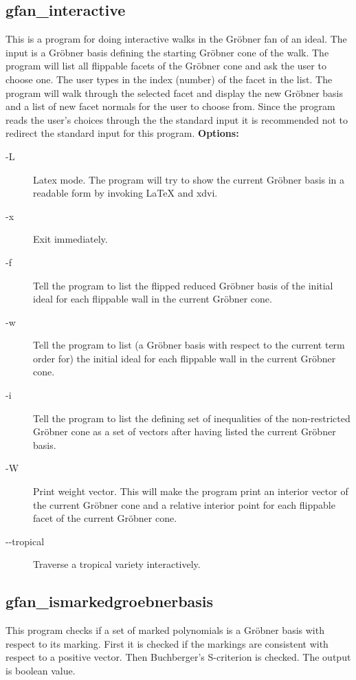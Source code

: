 {{{{{{{{{{{{{{{{\subsection{gfan\_interactive}\label{applist:_interactive}
This is a program for doing interactive walks in the Gr\"obner fan of an ideal. The input is a Gr\"obner basis defining the starting Gr\"obner cone of the walk. The program will list all flippable facets of the Gr\"obner cone and ask the user to choose one. The user types in the index (number) of the facet in the list. The program will walk through the selected facet and display the new Gr\"obner basis and a list of new facet normals for the user to choose from. Since the program reads the user's choices through the the standard input it is recommended not to redirect the standard input for this program.
\newline
{\bf Options:}
\begin{description}
\item[-L]Latex mode. The program will try to show the current Gr\"obner basis in a readable form by invoking LaTeX and xdvi.
\item[-x]Exit immediately.
\item[-f]Tell the program to list the flipped reduced Gr\"obner basis of the initial ideal for each flippable wall in the current Gr\"obner cone.
\item[-w]Tell the program to list (a Gr\"obner basis with respect to the current term order for) the initial ideal for each flippable wall in the current Gr\"obner cone.
\item[-i]Tell the program to list the defining set of inequalities of the non-restricted Gr\"obner cone as a set of vectors after having listed the current Gr\"obner basis.
\item[-W]Print weight vector. This will make the program print an interior vector of the current Gr\"obner cone and a relative interior point for each flippable facet of the current Gr\"obner cone.
\item[-\hspace{0.013cm}-tropical]Traverse a tropical variety interactively.\end{description}


{\subsection{gfan\_ismarkedgroebnerbasis}\label{applist:_ismarkedgroebnerbasis}
This program checks if a set of marked polynomials is a Gr\"obner basis with respect to its marking. First it is checked if the markings are consistent with respect to a positive vector. Then Buchberger's S-criterion is checked. The output is boolean value.


}}}}}}}}}}}}}}}}}
